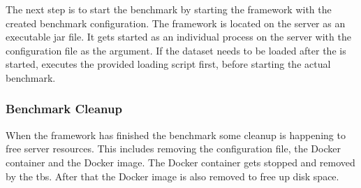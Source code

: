 The next step is to start the benchmark by starting the \iguana{} framework with the created benchmark configuration.
The \iguana{} framework is located on the server as an executable jar file.
It gets started as an individual process on the server with the configuration file as the argument.
If the dataset needs to be loaded after the \ts{} is started, \iguana{} executes the provided loading script first, before starting the actual benchmark.


\subsubsection{Benchmark Cleanup}
When the \iguana{} framework has finished the benchmark some cleanup is happening to free server resources.
This includes removing the \iguana{} configuration file, the Docker container and the Docker image.
The Docker container gets stopped and removed by the \ac{tbs}.
After that the Docker image is also removed to free up disk space.

